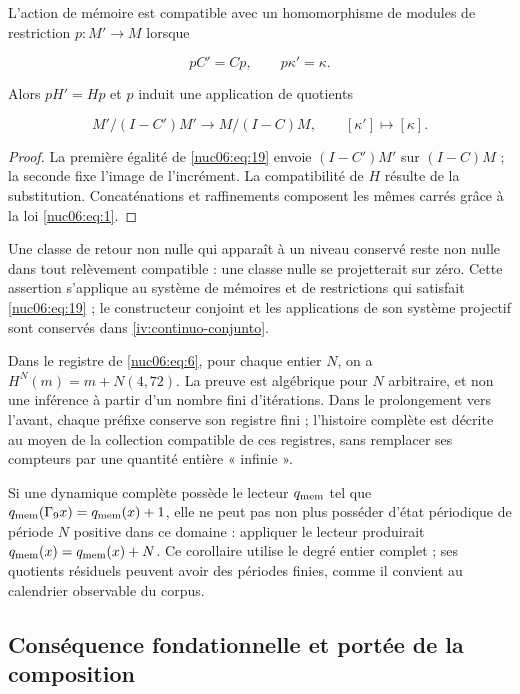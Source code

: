 L’action de mémoire est compatible avec un homomorphisme de modules de restriction \(p:M'\to M\) lorsque


\begin{equation}
pC'=Cp,\qquad p\kappa'=\kappa.
\label{nuc06:eq:19}
\end{equation}

Alors \(pH'=Hp\) et \(p\) induit une application de quotients

\begin{equation}
M'/(I-C')M'\longrightarrow M/(I-C)M,
\qquad [\kappa']\longmapsto[\kappa].
\label{nuc06:eq:20}
\end{equation}

\begin{proof}
La première égalité de \eqref{nuc06:eq:19} envoie \((I-C')M'\) sur \((I-C)M\) ; la seconde fixe l’image de l’incrément. La compatibilité de \(H\) résulte de la substitution. Concaténations et raffinements composent les mêmes carrés grâce à la loi \eqref{nuc06:eq:1}.

\end{proof}

Une classe de retour non nulle qui apparaît à un niveau conservé reste non nulle dans tout relèvement compatible : une classe nulle se projetterait sur zéro. Cette assertion s’applique au système de mémoires et de restrictions qui satisfait \eqref{nuc06:eq:19} ; le constructeur conjoint et les applications de son système projectif sont conservés dans \cref{iv:continuo-conjunto}.

Dans le registre de \eqref{nuc06:eq:6}, pour chaque entier \(N\), on a \(H^N(m)=m+N(4,72)\). La preuve est algébrique pour \(N\) arbitraire, et non une inférence à partir d’un nombre fini d’itérations. Dans le prolongement vers l’avant, chaque préfixe conserve son registre fini ; l’histoire complète est décrite au moyen de la collection compatible de ces registres, sans remplacer ses compteurs par une quantité entière « infinie ».

Si une dynamique complète possède le lecteur \(q_{\rm mem}\) tel que \(q_{\rm mem}(\Gamma_9x)=q_{\rm mem}(x)+1\), elle ne peut pas non plus posséder d’état périodique de période \(N\) positive dans ce domaine : appliquer le lecteur produirait \(q_{\rm mem}(x)=q_{\rm mem}(x)+N\). Ce corollaire utilise le degré entier complet ; ses quotients résiduels peuvent avoir des périodes finies, comme il convient au calendrier observable du corpus.


\subsection{Conséquence fondationnelle et portée de la composition}

